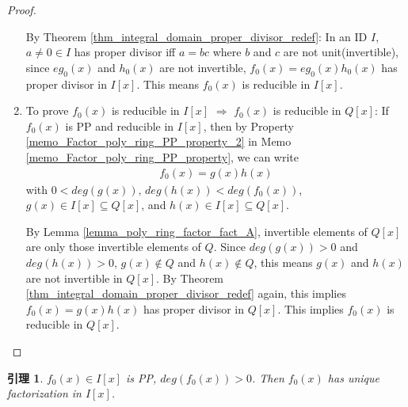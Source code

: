 \documentclass[utf8]{ctexbook}
\newtheorem{lemma}{引理}[section]
\begin{document}
\begin{proof}
\begin{enumerate}
{By Theorem \ref{thm_integral_domain_proper_divisor_redef}: In an ID $I$, $a \neq 0 \in I$ has proper divisor iff $a= bc$ where $b$ and $c$ are not unit(invertible), since $e g_0 (x)$ and $h_0 (x)$ are not invertible, $f_0 (x) = e g_0 (x) h_0 (x)$ has proper divisor in $I[x]$. This means $f_0 (x)$ is reducible in $I[x]$.
}
\item{To prove $f_0 (x)$ is reducible in $I[x]$ $\Longrightarrow$ $f_0 (x)$ is reducible in $Q[x]$: If $f_0 (x)$ is PP and reducible in $I[x]$, then by Property \ref{memo_Factor_poly_ring_PP_property_2} in Memo \ref{memo_Factor_poly_ring_PP_property}, we can write
\begin{align*}
f_0 (x) = g(x) h(x)
\end{align*}
with $0 < deg(g(x)), \, deg(h(x)) < deg(f_0 (x))$, $g(x) \in I[x] \subseteq Q[x]$, and $h(x) \in I[x] \subseteq Q[x]$. 

By Lemma \ref{lemma_poly_ring_factor_fact_A}, invertible elements of $Q[x]$ are only those invertible elements of $Q$. Since $deg(g(x)) > 0$ and $deg(h(x)) > 0$, $g(x) \not \in Q$ and $h(x) \not \in Q$, this means $g(x)$ and $h(x)$ are not invertible in $Q[x]$. By Theorem \ref{thm_integral_domain_proper_divisor_redef} again, this implies $f_0 (x) = g(x) h(x)$ has proper divisor in $Q[x]$. This implies $f_0 (x)$ is reducible in $Q[x]$.
}
\end{enumerate}

\end{proof}

\begin{lemma}
\label{lemma_Factor_poly_ring_4} $f_0 (x) \in I[x]$ is PP, $deg(f_0 (x)) > 0$. Then $f_0 (x)$ has unique factorization in $I[x]$.
\end{lemma}
\end{document}
